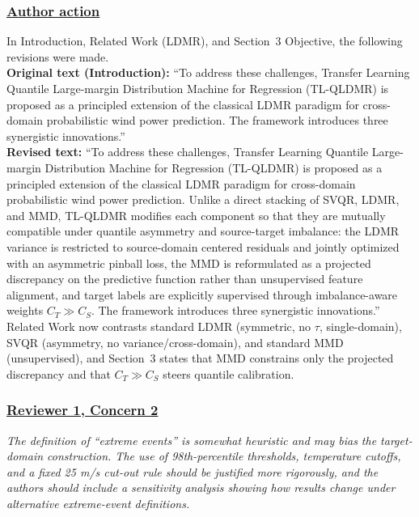 \documentclass[journal,12pn, onecolumn]{IEEEtran}
\begin{document}
{{{{{\color{black}
\subsubsection*{\textbf{\underline{Author action}}}
In Introduction, Related Work (LDMR), and Section~3 Objective, the following revisions were made.\\
\textbf{Original text (Introduction):} ``To address these challenges, Transfer Learning Quantile Large-margin Distribution Machine for Regression (TL-QLDMR) is proposed as a principled extension of the classical LDMR paradigm for cross-domain probabilistic wind power prediction. The framework introduces three synergistic innovations.''\\
\textbf{Revised text:} ``To address these challenges, Transfer Learning Quantile Large-margin Distribution Machine for Regression (TL-QLDMR) is proposed as a principled extension of the classical LDMR paradigm for cross-domain probabilistic wind power prediction. {\color{blue}Unlike a direct stacking of SVQR, LDMR, and MMD, TL-QLDMR modifies each component so that they are mutually compatible under quantile asymmetry and source-target imbalance: the LDMR variance is restricted to source-domain centered residuals and jointly optimized with an asymmetric pinball loss, the MMD is reformulated as a projected discrepancy on the predictive function rather than unsupervised feature alignment, and target labels are explicitly supervised through imbalance-aware weights $C_T \gg C_S$.} The framework introduces three synergistic innovations.''\\
Related Work now contrasts standard LDMR (symmetric, no $\tau$, single-domain), SVQR (asymmetry, no variance/cross-domain), and standard MMD (unsupervised), and Section~3 states that MMD constrains only the projected discrepancy and that $C_T \gg C_S$ steers quantile calibration.
\textcolor{customgreen}{
\subsubsection*{\underline{\textbf{Reviewer 1, Concern 2}}}
\emph{The definition of ``extreme events'' is somewhat heuristic and may bias the target-domain construction. The use of 98th-percentile thresholds, temperature cutoffs, and a fixed 25 m/s cut-out rule should be justified more rigorously, and the authors should include a sensitivity analysis showing how results change under alternative extreme-event definitions.}
}\\

}}}}}
\end{document}
